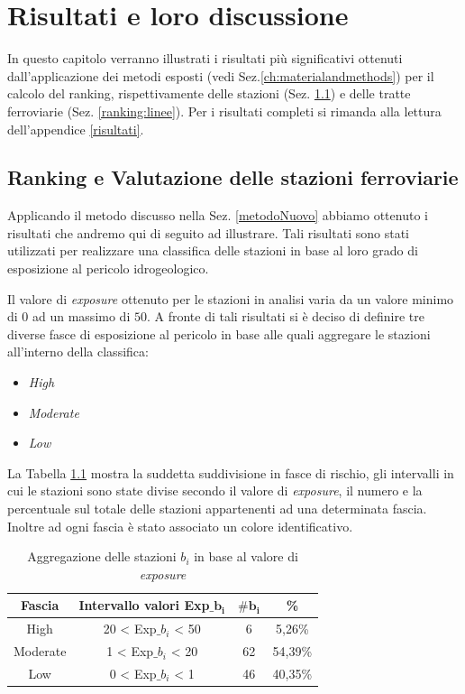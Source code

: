 \chapter{Risultati e loro discussione} 
\label{ch:risultatiediscussione} 

In questo capitolo verranno illustrati i risultati più significativi ottenuti dall'applicazione dei metodi esposti (vedi Sez.\ref{ch:materialandmethods}) per il calcolo del ranking, rispettivamente delle stazioni (Sez. \ref{ranking:Stazione}) e delle tratte ferroviarie (Sez. \ref{ranking:linee}).
Per i risultati completi si rimanda alla lettura dell'appendice \ref{risultati}.
\section{Ranking e  Valutazione delle stazioni ferroviarie}
\label{ranking:Stazione}
Applicando il metodo discusso nella Sez. \ref{metodoNuovo} abbiamo ottenuto i risultati che andremo qui di seguito ad illustrare.
Tali risultati sono stati utilizzati per realizzare una classifica delle stazioni in base al loro grado di esposizione al pericolo idrogeologico.

Il valore di \textit{exposure} ottenuto per le stazioni in analisi  varia da un valore minimo di $0$ ad un massimo di $50$. A fronte di tali risultati si è deciso di definire tre diverse fasce di esposizione al pericolo in base alle quali aggregare le stazioni all'interno della classifica:
\begin{itemize}
\item \textit{High}
\item \textit{Moderate}
\item \textit{Low}
\end{itemize}
La Tabella \ref{range} mostra la suddetta suddivisione in fasce di rischio, gli intervalli in cui le stazioni sono state divise secondo il valore di \textit{exposure}, il numero e la percentuale sul totale delle stazioni appartenenti ad una determinata fascia. Inoltre ad ogni fascia è stato associato un colore identificativo.
\begin{table}[h]
\centering
\begin{tabular}{|c|c|c|c|}
\hline
\rowcolor{lightgray}
\textbf{Fascia} & \textbf{Intervallo valori Exp$\mathbf{\_}$$\mathbf{b_i}$} & $\mathbf{\#b_i}$ & \textbf{\%} \\
\hline
\rowcolor{flamingopink}
High & 20 < Exp$\_$$b_i$ < 50 & 6 & 5,26\%\\
\hline
\rowcolor{icterine}
Moderate & 1 < Exp$\_$$b_i$ < 20 & 62 & 54,39\%\\
\hline
\rowcolor{inchworm}
Low & $0$ < Exp$\_$$b_i$ < 1 & 46 & 40,35\%\\
\hline
\end{tabular}
\caption{Aggregazione delle stazioni $b_i$ in base al valore di \textit{exposure} }
\label{range}
\end{table}

